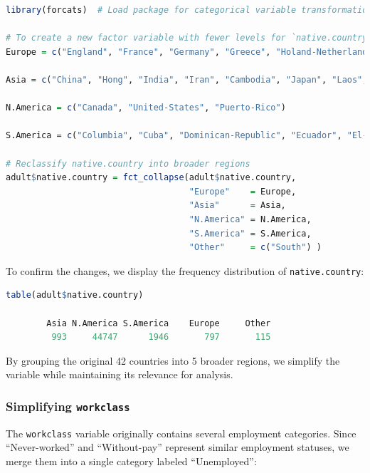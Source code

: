 \documentclass[
  11pt,
]{book}
\newcommand{\passthrough}[1]{#1}
\theoremstyle{definition}
\theoremstyle{definition}
\theoremstyle{definition}
\theoremstyle{definition}
\theoremstyle{remark}
\begin{document}
\begin{lstlisting}[language=R]
library(forcats)  # Load package for categorical variable transformation

# To create a new factor variable with fewer levels for `native.country`
Europe = c("England", "France", "Germany", "Greece", "Holand-Netherlands", "Hungary", "Ireland", "Italy", "Poland", "Portugal", "Scotland", "Yugoslavia")

Asia = c("China", "Hong", "India", "Iran", "Cambodia", "Japan", "Laos", "Philippines", "Vietnam", "Taiwan", "Thailand")

N.America = c("Canada", "United-States", "Puerto-Rico")

S.America = c("Columbia", "Cuba", "Dominican-Republic", "Ecuador", "El-Salvador", "Guatemala", "Haiti", "Honduras", "Mexico", "Nicaragua", "Outlying-US(Guam-USVI-etc)", "Peru", "Jamaica", "Trinadad&Tobago")

# Reclassify native.country into broader regions
adult$native.country = fct_collapse(adult$native.country, 
                                    "Europe"    = Europe,
                                    "Asia"      = Asia,
                                    "N.America" = N.America,
                                    "S.America" = S.America,
                                    "Other"     = c("South") )
\end{lstlisting}

To confirm the changes, we display the frequency distribution of \passthrough{\lstinline!native.country!}:

\begin{lstlisting}[language=R]
table(adult$native.country)
   
        Asia N.America S.America    Europe     Other 
         993     44747      1946       797       115
\end{lstlisting}

By grouping the original 42 countries into 5 broader regions, we simplify the variable while maintaining its relevance for analysis.

\subsubsection*{\texorpdfstring{Simplifying \texttt{workclass}}{Simplifying workclass}}\label{simplifying-workclass}


The \passthrough{\lstinline!workclass!} variable originally contains several employment categories. Since ``Never-worked'' and ``Without-pay'' represent similar employment statuses, we merge them into a single category labeled ``Unemployed'':
\end{document}
